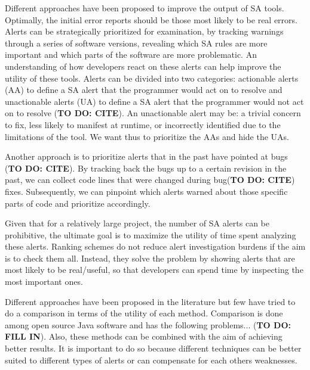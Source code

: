 Different approaches have been proposed to improve the output of SA tools. Optimally, the initial error reports should be those most likely to be real errors. Alerts can be strategically prioritized for examination, by tracking warnings through a series of software versions, revealing which SA rules are more important and which parts of the software are more problematic. 
An understanding of how developers react on these alerts can help improve the utility of these tools. Alerts can be divided into two categories: actionable alerts (AA) to define a SA alert that the programmer would act on to resolve and unactionable alerts (UA) to define a SA alert that the programmer would not act on to resolve (\textbf{TO DO: CITE}). An unactionable alert may be: a trivial concern to fix, less likely to manifest at runtime, or incorrectly identified due to the limitations of the tool. We want thus to prioritize the AAs and hide the UAs.

Another approach is to prioritize alerts that in the past have pointed at bugs (\textbf{TO DO: CITE}). By tracking back the bugs up to a certain revision in the past, we can collect code lines that were changed during bug(\textbf{TO DO: CITE}) fixes. Subsequently, we can pinpoint which alerts warned about those specific parts of code and prioritize accordingly.

Given that for a relatively large project, the number of SA alerts can be prohibitive, the ultimate goal is to maximize the utility of time spent analyzing these alerts. Ranking schemes do not reduce alert investigation burdens if the aim is to check them all. Instead, they solve the problem by showing alerts that are most likely to be real/useful, so that developers can spend time by inspecting the most important ones.

Different approaches have been proposed in the literature but few have tried to do a comparison in terms of the utility of each method. Comparison is done among open source Java software and has the following problems... (\textbf{TO DO: FILL IN}). Also, these methods can be combined with the aim of achieving better results. It is important to do so because different techniques can be better suited to different types of alerts or can compensate for each others weaknesses.

